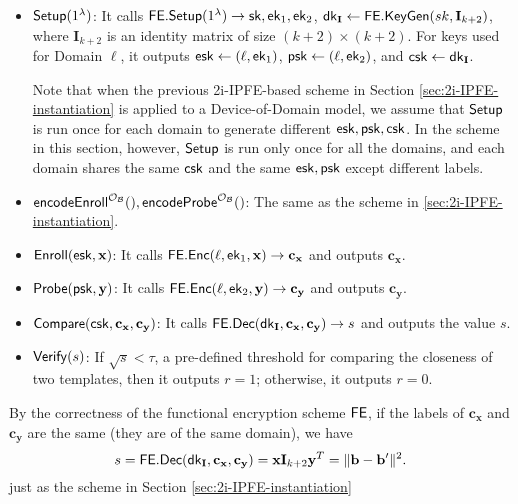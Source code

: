 \begin{itemize}

	\item ${\sf Setup}(1^\lambda)$: It calls ${\sf FE.Setup}(1^\lambda) \to {\sf sk}, {\sf ek}_1, {\sf ek}_2$, $ {\sf dk}_{\mathbf{I}} \gets {\sf FE.KeyGen}(sk, \mathbf{I}_{k+2})$, where $\mathbf{I}_{k+2}$ is an identity matrix of size $(k+2) \times (k+2)$. For keys used for {\sf Domain} $\ell$, it outputs ${\sf esk} \gets (\ell, {\sf ek}_1)$, ${\sf psk} \gets (\ell, {\sf ek}_2)$, and ${\sf csk} \gets {\sf dk}_{\mathbf{I}}$.

	Note that when the previous 2i-IPFE-based scheme in Section \ref{sec:2i-IPFE-instantiation} is applied to a Device-of-Domain model, we assume that ${\sf Setup}$ is run once for each domain to generate different ${\sf esk}, {\sf psk}, {\sf csk}$. In the scheme in this section, however, ${\sf Setup}$ is run only once for all the domains, and each domain shares the same ${\sf csk}$ and the same ${\sf esk}, {\sf psk}$ except different labels.

	\item ${\sf encodeEnroll}^{\mathcal{O}_{\mathcal{B}}}(), {\sf encodeProbe}^{\mathcal{O}_{\mathcal{B}}}()$: The same as the scheme in \ref{sec:2i-IPFE-instantiation}. 

	\item ${\sf Enroll}({\sf esk}, \mathbf{x})$: It calls ${\sf FE.Enc}(\ell, {\sf ek}_1, \mathbf{x}) \to \mathbf{c_x}$ and outputs $\mathbf{c_x}$.

	\item ${\sf Probe}({\sf psk}, \mathbf{y})$: It calls ${\sf FE.Enc}(\ell, {\sf ek}_2, \mathbf{y}) \to \mathbf{c_y}$ and outputs $\mathbf{c_y}$.

	\item ${\sf Compare}({\sf csk}, \mathbf{c_x}, \mathbf{c_y)}$: It calls ${\sf FE.Dec}({\sf dk}_{\mathbf{I}}, \mathbf{c_x}, \mathbf{c_y}) \to s$ and outputs the value $s$.

	\item ${\sf Verify}(s)$: If $\sqrt{s} < \tau$, a pre-defined threshold for comparing the closeness of two templates, then it outputs $r = 1$; otherwise, it outputs $r = 0$.

\end{itemize}

By the correctness of the functional encryption scheme $\sf FE$, if the labels of $\mathbf{c_x}$ and $\mathbf{c_y}$ are the same (they are of the same domain), we have
\[
	s = {\sf FE.Dec}({\sf dk}_{\mathbf{I}}, \mathbf{c_x}, \mathbf{c_y}) =  \mathbf{x} \mathbf{I}_{k+2} \mathbf{y}^T = \| \mathbf{b} - \mathbf{b'} \|^2.
\]
just as the scheme in Section \ref{sec:2i-IPFE-instantiation}

